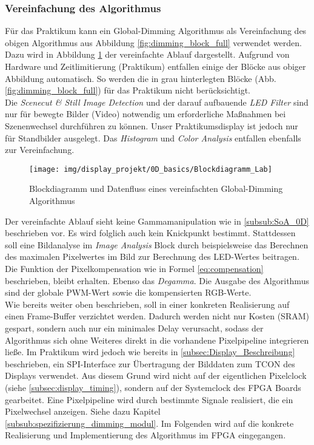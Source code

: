 \subsubsection{Vereinfachung des Algorithmus}
Für das Praktikum kann ein Global-Dimming Algorithmus als Vereinfachung des obigen Algorithmus aus Abbildung \ref{fig:dimming_block_full} verwendet werden. Dazu wird in Abbildung \ref{fig:dimming_block_Lab} der vereinfachte Ablauf dargestellt. Aufgrund von Hardware und Zeitlimitierung (Praktikum) entfallen einige der Blöcke aus obiger Abbildung automatisch. So werden die in grau hinterlegten Blöcke (Abb. \ref{fig:dimming_block_full}) für das Praktikum nicht berücksichtigt. \\
Die \emph{Scenecut \& Still Image Detection} und der darauf aufbauende \emph{LED Filter} sind nur für bewegte Bilder (Video) notwendig um erforderliche Maßnahmen bei Szenenwechsel durchführen zu können. Unser Praktikumsdisplay ist jedoch nur für Standbilder ausgelegt. Das \emph{Histogram} und \emph{Color Analysis} entfallen ebenfalls zur Vereinfachung.
\label{subsub:vereinfachung_0D}
\begin{figure}[H]
	\centering
	\texttt{[image: img/display\_projekt/0D\_basics/Blockdiagramm\_Lab]}
	\caption{Blockdiagramm und Datenfluss eines vereinfachten Global-Dimming Algorithmus}
	\label{fig:dimming_block_Lab}
\end{figure}
Der vereinfachte Ablauf sieht keine Gammamanipulation wie in \ref{subsub:SoA_0D} beschrieben vor. Es wird folglich auch kein Knickpunkt bestimmt. Stattdessen soll eine Bildanalyse im \emph{Image Analysis} Block durch beispielsweise das Berechnen des maximalen Pixelwertes im Bild zur Berechnung des LED-Wertes beitragen.  Die Funktion der Pixelkompensation wie in Formel \ref{eq:compensation} beschrieben, bleibt erhalten. Ebenso das \emph{Degamma}. Die Ausgabe des Algorithmus sind der globale PWM-Wert sowie die kompensierten RGB-Werte. \\
Wie bereits weiter oben beschrieben, soll in einer konkreten Realisierung auf einen Frame-Buffer verzichtet werden. Dadurch werden nicht nur Kosten (SRAM) gespart, sondern auch nur ein minimales Delay verursacht, sodass der Algorithmus sich ohne Weiteres direkt in die vorhandene Pixelpipeline integrieren ließe. Im Praktikum wird jedoch wie bereits in \ref{subsec:Display_Beschreibung} beschrieben, ein SPI-Interface zur Übertragung der Bilddaten zum TCON des Displays verwendet. Aus diesem Grund wird nicht auf der eigentlichen Pixelclock (siehe \ref{subsec:display_timing}), sondern auf der Systemclock des FPGA Boards gearbeitet. Eine Pixelpipeline wird durch bestimmte Signale realisiert, die ein Pixelwechsel anzeigen. Siehe dazu Kapitel \ref{subsub:spezifizierung_dimming_modul}. Im Folgenden wird auf die konkrete Realisierung und Implementierung des Algorithmus im FPGA eingegangen. 
